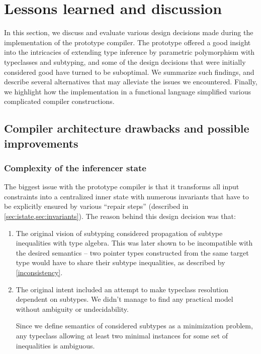 \chapter{Lessons learned and discussion}
\label{chap5}

In this section, we discuss and evaluate various design decisions made during the implementation of the prototype compiler. The prototype offered a good insight into the intricacies of extending type inference by parametric polymorphism with typeclasses and subtyping, and some of the design decisions that were initially considered good have turned to be suboptimal. We summarize such findings, and describe several alternatives that may alleviate the issues we encountered. Finally, we highlight how the implementation in a functional language simplified various complicated compiler constructions.

\section{Compiler architecture drawbacks and possible improvements}
\label{sec:newApproach}

\subsection{Complexity of the inferencer state}
\label{sec:state}

The biggest issue with the prototype compiler is that it transforms all input constraints into a centralized inner state with numerous invariants that have to be explicitly ensured by various ``repair steps'' (described in \cref{sec:istate,sec:invariants}). The reason behind this design decision was that:

\begin{enumerate}
    \item The original vision of subtyping considered propagation of subtype inequalities with type algebra. This was later shown to be incompatible with the desired semantics -- two pointer types constructed from the same target type would have to share their subtype inequalities, as described by \cref{inconsistency}.

    \item The original intent included an attempt to make typeclass resolution dependent on subtypes. We didn't manage to find any practical model without ambiguity or undecidability.

    Since we define semantics of considered subtypes as a minimization problem, any typeclass allowing at least two minimal instances for some set of inequalities is ambiguous.
\end{enumerate}

